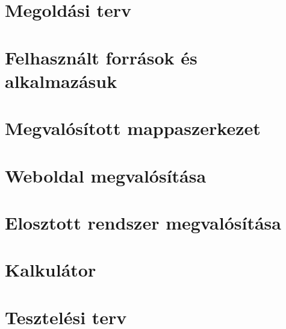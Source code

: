 \begin{comment}
-------------------------------------------------------
A Fejlesztői dokumentáció tartalmazza
- a probléma részletes specifikációját,
- a felhasznált módszerek részletes leírását, a használt fogalmak definícióját,
- a program logikai és fizikai szerkezetének leírását (adatszerkezetek, adatbázisok,
modulfelbontás),
- a tesztelési tervet és a tesztelés eredményeit.
-------------------------------------------------------
\end{comment}

\section{Megoldási terv}


\section{Felhasznált források és alkalmazásuk}


\section{Megvalósított mappaszerkezet}


\section{Weboldal megvalósítása}


\section{Elosztott rendszer  megvalósítása}


\section{Kalkulátor}



\section{Tesztelési terv}
